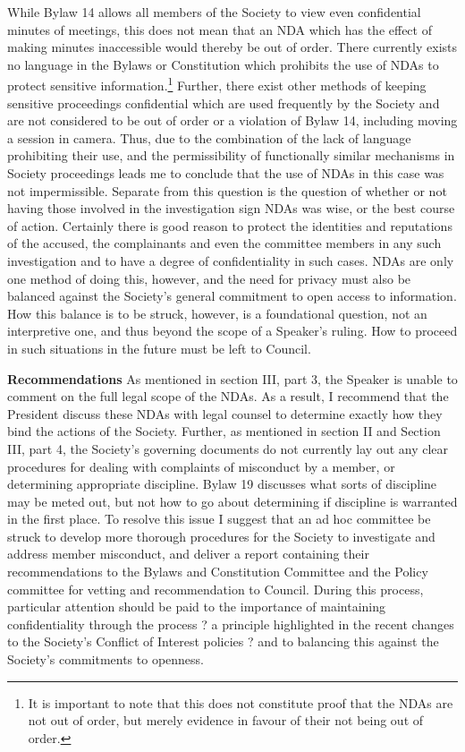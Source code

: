 \begin{longenum}[ label*=\arabic*., align=left]
\begin{longenum}
While Bylaw 14 allows all members of the Society to view even confidential minutes of meetings, this does not mean that an NDA which has the effect of making minutes inaccessible would thereby be out of order. There currently exists no language in the Bylaws or Constitution which prohibits the use of NDAs to protect sensitive information.\footnote{It is important to note that this does not constitute proof that the NDAs are not out of order, but merely evidence in favour of their not being out of order.}  Further, there exist other methods of keeping sensitive proceedings confidential which are used frequently by the Society and are not considered to be out of order or a violation of Bylaw 14, including moving a session in camera. Thus, due to the combination of the lack of language prohibiting their use, and the permissibility of functionally similar mechanisms in Society proceedings leads me to conclude that the use of NDAs in this case was not impermissible.
Separate from this question is the question of whether or not having those involved in the investigation sign NDAs was wise, or the best course of action. Certainly there is good reason to protect the identities and reputations of the accused, the complainants and even the committee members in any such investigation and to have a degree of confidentiality in such cases. NDAs are only one method of doing this, however, and the need for privacy must also be balanced against the Society's general commitment to open access to information. How this balance is to be struck, however, is a foundational question, not an interpretive one, and thus beyond the scope of a Speaker's ruling. How to proceed in such situations in the future must be left to Council.
\end{longenum}
\item \textbf{Recommendations}
As mentioned in section III, part 3, the Speaker is unable to comment on the full legal scope of the NDAs. As a result, I recommend that the President discuss these NDAs with legal counsel to determine exactly how they bind the actions of the Society.
Further, as mentioned in section II and Section III, part 4, the Society's governing documents do not currently lay out any clear procedures for dealing with complaints of misconduct by a member, or determining appropriate discipline. Bylaw 19 discusses what sorts of discipline may be meted out, but not how to go about determining if discipline is warranted in the first place. To resolve this issue I suggest that an ad hoc committee be struck to develop more thorough procedures for the Society to investigate and address member misconduct, and deliver a report containing their recommendations to the Bylaws and Constitution Committee and the Policy committee for vetting and recommendation to Council. During this process, particular attention should be paid to the importance of maintaining confidentiality through the process ? a principle highlighted in the recent changes to the Society's Conflict of Interest policies ? and to balancing this against the Society's commitments to openness.


\end{longenum}
